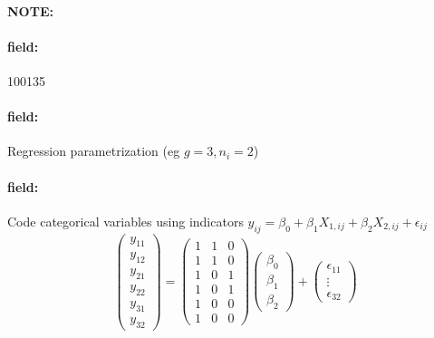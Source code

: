 \documentclass[12pt]{article}
\newenvironment{note}{\paragraph{NOTE:}}{}
\newenvironment{field}{\paragraph{field:}}{}
\begin{document}
\begin{note}
    \begin{field}
        \tiny 100135
    \end{field}
    \begin{field}
        Regression parametrization (eg $g = 3, n_i = 2$)
    \end{field}
    \begin{field}
      Code categorical variables using indicators
      $y_{ij} = \beta_0 + \beta_1X_{1,ij} + \beta_2X_{2,ij} + \epsilon_{ij}$
      $$ \begin{pmatrix}
            y_{11} \\ y_{12} \\ y_{21} \\ y_{22} \\ y_{31} \\y_{32}
      \end{pmatrix}  = \begin{pmatrix}
            1 & 1 & 0 \\
            1 & 1 & 0 \\
            1 & 0 & 1 \\
            1 & 0 & 1 \\
            1 & 0 & 0 \\
            1 & 0 & 0
      \end{pmatrix} \begin{pmatrix}
            \beta_0 \\ \beta_1 \\ \beta_2
      \end{pmatrix} + \begin{pmatrix}
            \epsilon_{11} \\ \vdots \\ \epsilon_{32}
      \end{pmatrix}$$
    \end{field}
\end{note}
\end{document}

